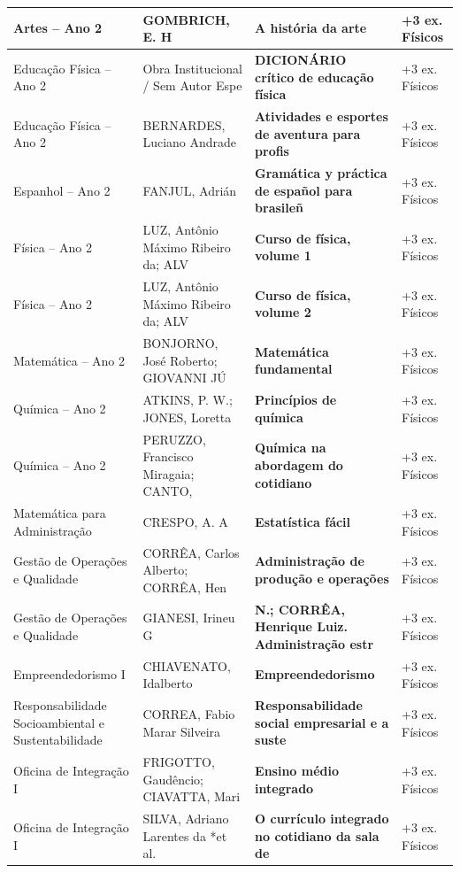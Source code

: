 \documentclass[10pt,a4paper]{article}
\begin{document}
\begin{xltabular}{\linewidth}{|p{3.8cm}|p{3.2cm}|X|p{2.2cm}|}
Artes -- Ano 2 & GOMBRICH, E. H & \textbf{A história da arte} & +3 ex. Físicos \\ \hline
Educação Física -- Ano 2 & Obra Institucional / Sem Autor Espe & \textbf{DICIONÁRIO crítico de educação física} & +3 ex. Físicos \\ \hline
Educação Física -- Ano 2 & BERNARDES, Luciano Andrade & \textbf{Atividades e esportes de aventura para profis} & +3 ex. Físicos \\ \hline
Espanhol -- Ano 2 & FANJUL, Adrián & \textbf{Gramática y práctica de español para brasileñ} & +3 ex. Físicos \\ \hline
Física -- Ano 2 & LUZ, Antônio Máximo Ribeiro da; ALV & \textbf{Curso de física, volume 1} & +3 ex. Físicos \\ \hline
Física -- Ano 2 & LUZ, Antônio Máximo Ribeiro da; ALV & \textbf{Curso de física, volume 2} & +3 ex. Físicos \\ \hline
Matemática -- Ano 2 & BONJORNO, José Roberto; GIOVANNI JÚ & \textbf{Matemática fundamental} & +3 ex. Físicos \\ \hline
Química -- Ano 2 & ATKINS, P. W.; JONES, Loretta & \textbf{Princípios de química} & +3 ex. Físicos \\ \hline
Química -- Ano 2 & PERUZZO, Francisco Miragaia; CANTO, & \textbf{Química na abordagem do cotidiano} & +3 ex. Físicos \\ \hline
Matemática para Administração & CRESPO, A. A & \textbf{Estatística fácil} & +3 ex. Físicos \\ \hline
Gestão de Operações e Qualidade & CORRÊA, Carlos Alberto; CORRÊA, Hen & \textbf{Administração de produção e operações} & +3 ex. Físicos \\ \hline
Gestão de Operações e Qualidade & GIANESI, Irineu G & \textbf{N.; CORRÊA, Henrique Luiz. Administração estr} & +3 ex. Físicos \\ \hline
Empreendedorismo I & CHIAVENATO, Idalberto & \textbf{Empreendedorismo} & +3 ex. Físicos \\ \hline
Responsabilidade Socioambiental e Sustentabilidade & CORREA, Fabio Marar Silveira & \textbf{Responsabilidade social empresarial e a suste} & +3 ex. Físicos \\ \hline
Oficina de Integração I & FRIGOTTO, Gaudêncio; CIAVATTA, Mari & \textbf{Ensino médio integrado} & +3 ex. Físicos \\ \hline
Oficina de Integração I & SILVA, Adriano Larentes da  *et al. & \textbf{O currículo integrado no cotidiano da sala de} & +3 ex. Físicos \\ \hline

\end{xltabular}
\end{document}
